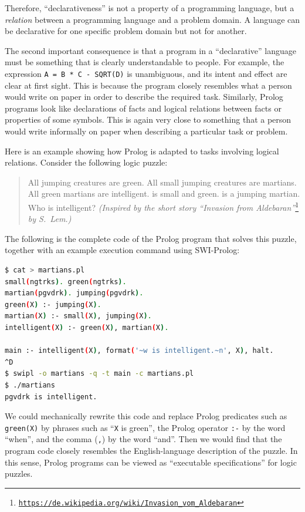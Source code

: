 Therefore, \textsf{``}declarativeness\textsf{''} is not  a property of a programming
language, but a \emph{relation} between a programming language and
a problem domain. A language can be declarative for one specific problem
domain but not for another.

The second important consequence is that a program in a \textsf{``}declarative\textsf{''}
language must be something that is clearly understandable to people.
For example, the expression \lstinline!A = B * C - SQRT(D)! is unambiguous,
and its intent and effect are clear at first sight. This is because
the program closely resembles what a person would write on paper in
order to describe the required task. Similarly, Prolog programs look
like declarations of facts and logical relations between facts or
properties of some symbols. This is again very close to something
that a person would write informally on paper when describing a particular
task or problem.

Here is an example showing how Prolog is adapted to tasks involving
logical relations. Consider the following logic puzzle:
\begin{quotation}
All jumping creatures are green. All small jumping creatures are martians.
All green martians are intelligent.  is small and green.
 is a jumping martian. Who is intelligent? \emph{(Inspired
by the short story \textsf{``}Invasion from Aldebaran\textsf{''}}\footnote{\texttt{\href{https://de.wikipedia.org/wiki/Invasion_vom_Aldebaran}{https://de.wikipedia.org/wiki/Invasion\_vom\_Aldebaran}}}\emph{
by S.~Lem.)}
\end{quotation}
The following is the complete code of the Prolog program that solves
this puzzle, together with an example execution command using SWI-Prolog:
\begin{lstlisting}[language=bash]
$ cat > martians.pl
small(ngtrks). green(ngtrks).
martian(pgvdrk). jumping(pgvdrk).
green(X) :- jumping(X).
martian(X) :- small(X), jumping(X).
intelligent(X) :- green(X), martian(X).

main :- intelligent(X), format('~w is intelligent.~n', X), halt.
^D
$ swipl -o martians -q -t main -c martians.pl
$ ./martians
pgvdrk is intelligent.
\end{lstlisting}
We could mechanically rewrite this code and replace Prolog predicates
such as \lstinline!green(X)! by phrases such as \textsf{``}\lstinline!X!
is green\textsf{''}, the Prolog operator \lstinline!:-! by the word \textsf{``}when\textsf{''},
and the comma (\lstinline!,!) by the word \textsf{``}and\textsf{''}. Then we would
find that the program code closely resembles the English-language
description of the puzzle. In this sense, Prolog programs can be viewed
as \textsf{``}executable specifications\textsf{''} for logic puzzles. 

